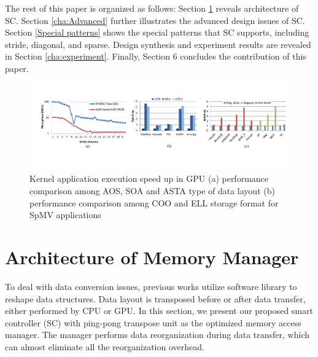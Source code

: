 \documentclass[10pt,journal,compsoc]{IEEEtran}
\begin{document}
The rest of this paper is organized as follows:
Section \ref{cha:architecture} reveals architecture of SC. Section \ref{cha:Advanced} further illustrates the
advanced design issues of SC. Section \ref{Special patterns} shows the special patterns that SC supports, including stride, diagonal, and sparse.
Design synthesis and experiment results are revealed in Section \ref{cha:experiment}. Finally, Section 6 concludes the contribution of this paper.


\begin{figure}[htb]
\footnotesize
\begin{center}
\graphicspath{{picture/}}
\includegraphics[scale=0.6]{motivation_benchmark}
\caption{Kernel application execution speed up in GPU (a) performance comparison among AOS, SOA and ASTA type of data layout (b) performance comparison among COO and ELL storage format for SpMV applications}
\label{fig:ap_benchmark}
\end{center}
\end{figure}

\section{Architecture of Memory Manager}\label{cha:architecture}
To deal with data conversion issues, previous works utilize software library to reshape data structures.
Data layout is transposed before or after data transfer, either performed by CPU or GPU. In this section,
we present our proposed  smart controller (SC) with ping-pong transpose unit as the optimized memory access manager.
The manager performs data reorganization during data transfer, which can almost eliminate all the reorganization overhead.
\end{document}
